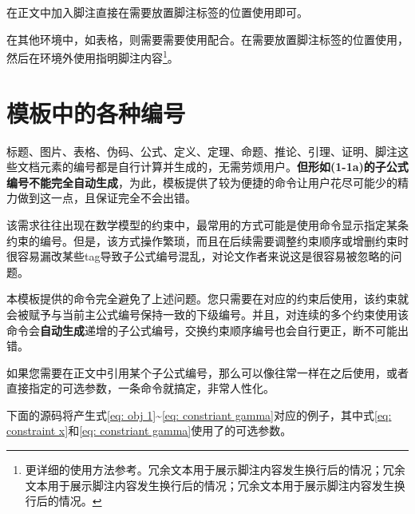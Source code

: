 \documentclass[print, doctor, vlined]{DissertUESTC}
\begin{document}
	在正文中加入脚注直接在需要放置脚注标签的位置使用即可。
	
	在其他环境中，如表格，则需要需要使用配合。在需要放置脚注标签的位置使用，然后在环境外使用指明脚注内容\footnote{更详细的使用方法参考\href{https://blog.csdn.net/xovee/article/details/127563209}{}。冗余文本用于展示脚注内容发生换行后的情况；冗余文本用于展示脚注内容发生换行后的情况；冗余文本用于展示脚注内容发生换行后的情况。}。
	
	
	\section{模板中的各种编号}
	
	标题、图片、表格、伪码、公式、定义、定理、命题、推论、引理、证明、脚注这些文档元素的编号都是自行计算并生成的，无需劳烦用户。\textbf{但形如(1-1a)的子公式编号不能完全自动生成}，为此，模板提供了较为便捷的命令让用户花尽可能少的精力做到这一点，且保证完全不会出错。
	
	该需求往往出现在数学模型的约束中，最常用的方式可能是使用命令显示指定某条约束的编号。但是，该方式操作繁琐，而且在后续需要调整约束顺序或增删约束时很容易漏改某些tag导致子公式编号混乱，对论文作者来说这是很容易被忽略的问题。
	
	本模板提供的命令完全避免了上述问题。您只需要在对应的约束后使用，该约束就会被赋予与当前主公式编号保持一致的下级编号。并且，对连续的多个约束使用该命令会\textbf{自动生成}递增的子公式编号，交换约束顺序编号也会自行更正，断不可能出错。
	
	如果您需要在正文中引用某个子公式编号，那么可以像往常一样在之后使用，或者直接指定的可选参数，一条命令就搞定，非常人性化。
	
	下面的源码将产生式\eqref{eq: obj 1}\textasciitilde \eqref{eq: constriant gamma}对应的例子，其中式\eqref{eq: constraint x}和\eqref{eq: constriant gamma}使用了的可选参数。
	
\end{document}
